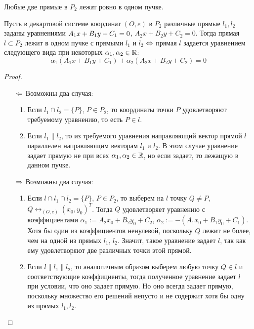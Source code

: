 \begin{note}
	Любые две прямые в $P_2$ лежат ровно в одном пучке.
\end{note}

\begin{theorem}
	Пусть в декартовой системе координат $(O, e)$ в $P_2$ различные прямые $l_1, l_2$ заданы уравнениями $A_1x\hm{+}B_1y+C_1=0$, $A_2x+B_2y+C_2=0$. Тогда прямая $l \subset P_2$ лежит в одном пучке с прямыми $l_1$ и $l_2$ $\Leftrightarrow$ прямая $l$ задается уравнением следующего вида при некоторых $\alpha_1, \alpha_2 \in \mathbb{R}$:
	\[\alpha_1(A_1x+B_1y+C_1) + \alpha_2(A_2x+B_2y+C_2) = 0\]
\end{theorem}

\begin{proof}~
	\begin{itemize}
		\item[$\Leftarrow$] Возможны два случая:
		\begin{enumerate}
			\item Если $l_1 \cap l_2 = \{P\}$, $P \in P_2$, то координаты точки $P$ удовлетворяют требуемому уравнению, то есть $P \in l$.
			\item Если $l_1 \parallel l_2$, то из требуемого уравнения направляющий вектор прямой $l$ параллелен направляющим векторам $l_1$ и $l_2$. В этом случае уравнение задает прямую не при всех $\alpha_1, \alpha_2 \in \mathbb{R}$, но если задает, то лежащую в данном пучке.
		\end{enumerate}
		
		\item[$\Rightarrow$] Возможны два случая:
		\begin{enumerate}
			\item Если $l \cap l_1 \cap l_2 = \{P\}$, $P \in P_2$, то выберем на $l$ точку $Q \ne P$, $Q \leftrightarrow_{(O, e)} (x_0, y_0)^T$. Тогда $Q$ удовлетворяет уравнению с коэффициентами $\alpha_1 := A_2x_0+B_2y_0+C_2$, $\alpha_2 := -(A_1x_0+B_1y_0+C_1)$. Хотя бы один из коэффициентов ненулевой, поскольку $Q$ лежит не более, чем на одной из прямых $l_1$, $l_2$. Значит, такое уравнение задает $l$, так как ему удовлетворяют две различных точки этой прямой.
			
			\item Если $l \parallel l_1 \parallel l_2$, то аналогичным образом выберем любую точку $Q \in l$ и соответствующие коэффициенты, тогда полученное уравнение задает $l$ при условии, что оно задает прямую. Но оно всегда задает прямую, поскольку множество его решений непусто и не содержит хотя бы одну из прямых $l_1, l_2$.\qedhere
		\end{enumerate}
	\end{itemize}
\end{proof}

